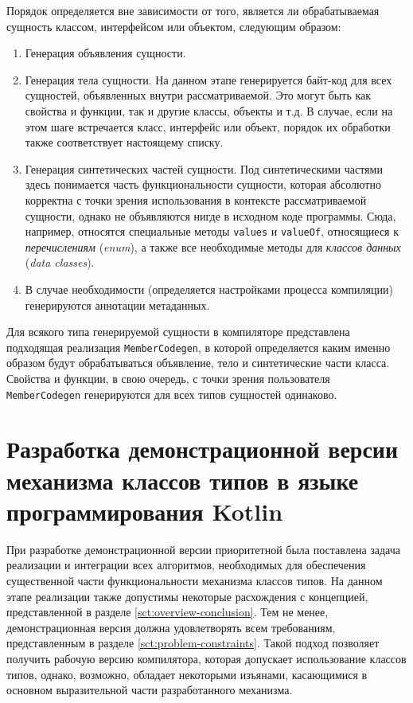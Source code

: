 Порядок определяется вне зависимости от того, является ли обрабатываемая сущность классом, интерфейсом или объектом, следующим образом:
\begin{enumerate}
    \item Генерация объявления сущности.
    \item Генерация тела сущности. На данном этапе генерируется байт-код для всех сущностей, объявленных внутри рассматриваемой. Это могут быть как свойства и функции, так и другие классы, объекты и т.д. В случае, если на этом шаге встречается класс, интерфейс или объект, порядок их обработки также соответствует настоящему списку. 
    \item Генерация синтетических частей сущности. Под синтетическими частями здесь понимается часть функциональности сущности, которая абсолютно корректна с точки зрения использования в контексте рассматриваемой сущности, однако не объявляются нигде в исходном коде программы. Сюда, например, относятся специальные методы \lstinline{values} и \lstinline{valueOf}, относящиеся к \emph{перечислениям} (\emph{enum}), а также все необходимые методы для \emph{классов данных} (\emph{data classes}).  
    \item В случае необходимости (определяется настройками процесса компиляции) генерируются аннотации метаданных.
\end{enumerate}
Для всякого типа генерируемой сущности в компиляторе представлена подходящая реализация \lstinline{MemberCodegen}, в которой определяется каким именно образом будут обрабатываться объявление, тело и синтетические части класса. Свойства и функции, в свою очередь, с точки зрения пользователя \lstinline{MemberCodegen} генерируются для всех типов сущностей одинаково.

\section{Разработка демонстрационной версии механизма классов типов в языке программирования Kotlin}

При разработке демонстрационной версии приоритетной была поставлена задача реализации и интеграции всех алгоритмов, необходимых для обеспечения существенной части функциональности механизма классов типов. На данном этапе реализации также допустимы некоторые расхождения с концепцией, представленной в разделе \ref{sct:overview-conclusion}. Тем не менее, демонстрационная версия должна удовлетворять всем требованиям, представленным в разделе \ref{sct:problem-constraints}. Такой подход позволяет получить рабочую версию компилятора, которая допускает использование классов типов, однако, возможно, обладает некоторыми изъянами, касающимися в основном выразительной части разработанного механизма. 


